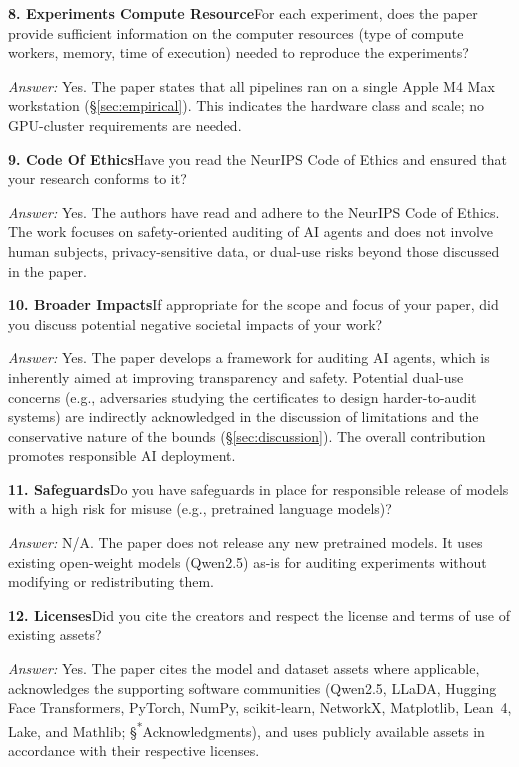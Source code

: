 \documentclass{article}
\begin{document}
\noindent\textbf{8. Experiments Compute Resource}\quad For each experiment, does the paper provide sufficient information on the computer resources (type of compute workers, memory, time of execution) needed to reproduce the experiments?

\emph{Answer:} Yes. The paper states that all pipelines ran on a single Apple M4 Max workstation (\S\ref{sec:empirical}). This indicates the hardware class and scale; no GPU-cluster requirements are needed.

\noindent\textbf{9. Code Of Ethics}\quad Have you read the NeurIPS Code of Ethics and ensured that your research conforms to it?

\emph{Answer:} Yes. The authors have read and adhere to the NeurIPS Code of Ethics. The work focuses on safety-oriented auditing of AI agents and does not involve human subjects, privacy-sensitive data, or dual-use risks beyond those discussed in the paper.

\noindent\textbf{10. Broader Impacts}\quad If appropriate for the scope and focus of your paper, did you discuss potential negative societal impacts of your work?

\emph{Answer:} Yes. The paper develops a framework for auditing AI agents, which is inherently aimed at improving transparency and safety. Potential dual-use concerns (e.g., adversaries studying the certificates to design harder-to-audit systems) are indirectly acknowledged in the discussion of limitations and the conservative nature of the bounds (\S\ref{sec:discussion}). The overall contribution promotes responsible AI deployment.

\noindent\textbf{11. Safeguards}\quad Do you have safeguards in place for responsible release of models with a high risk for misuse (e.g., pretrained language models)?

\emph{Answer:} N/A. The paper does not release any new pretrained models. It uses existing open-weight models (Qwen2.5) as-is for auditing experiments without modifying or redistributing them.

\noindent\textbf{12. Licenses}\quad Did you cite the creators and respect the license and terms of use of existing assets?

\emph{Answer:} Yes. The paper cites the model and dataset assets where applicable, acknowledges the supporting software communities (Qwen2.5, LLaDA, Hugging Face Transformers, PyTorch, NumPy, scikit-learn, NetworkX, Matplotlib, Lean~4, Lake, and Mathlib; \S\textsuperscript{*}Acknowledgments), and uses publicly available assets in accordance with their respective licenses.
\end{document}
